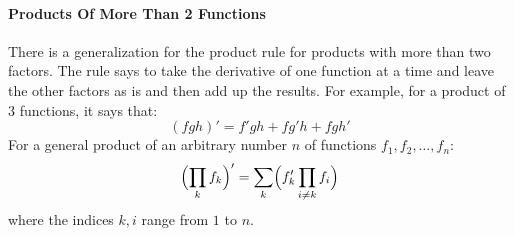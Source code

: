 \paragraph{Products Of More Than 2 Functions}

There is a generalization for the product rule for products with more than two factors. The rule says to take the derivative of one function at a time and leave the other factors as is and then add up the results. For example, for a product of 3 functions, it says that:
\begin{equation}
(fgh)' =  f' g h + f g' h + f g h'
\end{equation}
For a general product of an arbitrary number $n$ of functions $f_1, f_2, \ldots, f_n$:
\begin{equation}
\Bigl(  \prod_k f_k   \Bigr) '
= \sum_k \Bigl( f_k' \prod_{i \neq k} f_i  \Bigr) 
\end{equation}
where the indices $k,i$ range from $1$ to $n$.


